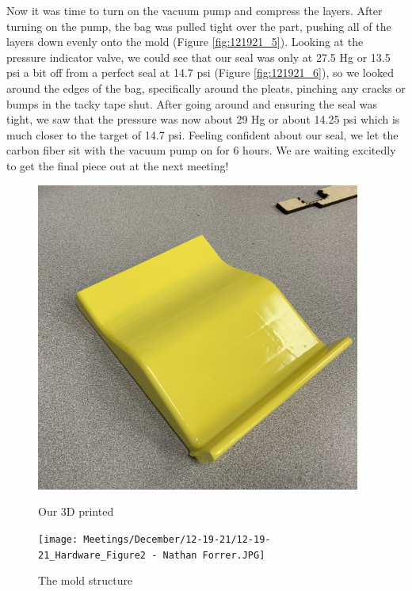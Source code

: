 Now it was time to turn on the vacuum pump and compress the layers. After turning on the pump, the bag was pulled tight over the part, pushing all of the layers down evenly onto the mold (Figure \ref{fig:121921_5}). Looking at the pressure indicator valve, we could see that our seal was only at 27.5 Hg or 13.5 psi a bit off from a perfect seal at 14.7 psi (Figure \ref{fig:121921_6}), so we looked around the edges of the bag, specifically around the pleats, pinching any cracks or bumps in the tacky tape shut. After going around and ensuring the seal was tight, we saw that the pressure was now about 29 Hg or about 14.25 psi which is much closer to the target of 14.7 psi. Feeling confident about our seal, we let the carbon fiber sit with the vacuum pump on for 6 hours. We are waiting excitedly to get the final piece out at the next meeting!

\begin{figure}[ht]
\centering
\begin{minipage}[b]{.48\textwidth}
  \centering
  \includegraphics[width=0.95\textwidth]{Meetings/December/12-19-21/12-19-21_Hardware_Figure1 - Nathan Forrer.jpg}
  \caption{Our 3D printed}
  \label{fig:121921_1}
\end{minipage}%
\hfill%
\begin{minipage}[b]{.48\textwidth}
  \centering
  \texttt{[image: Meetings/December/12-19-21/12-19-21\_Hardware\_Figure2 - Nathan Forrer.JPG]}
  \caption{The mold structure}
  \label{fig:121921_2}
\end{minipage}
\end{figure}

